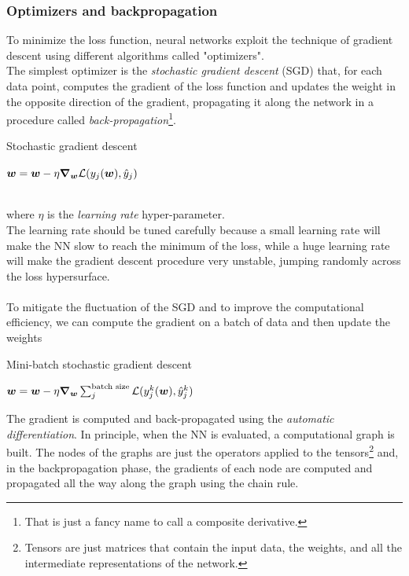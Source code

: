 \subsubsection*{Optimizers and backpropagation}
To minimize the loss function, neural networks exploit the technique of gradient descent using different algorithms called "optimizers".\\
The simplest optimizer is the \textit{stochastic gradient descent} (SGD) that, for each data point, computes the gradient of the loss function and updates the weight in the opposite direction of the gradient, propagating it along the network in a procedure called \textit{back-propagation}\footnote{That is just a fancy name to call a composite derivative.}.
\begin{algorithm}
\caption{Stochastic gradient descent}\label{algo:SGD}
\begin{algorithmic}[1]
            \State $\bm{w}=\bm{w}-\eta \grad_{\bm{w}} \mathcal{L}(y_j(\bm{w}),\hat{y}_j)$
        \EndFor
    \EndFor
\end{algorithmic}
\end{algorithm}\\
where $\eta$ is the \textit{learning rate} hyper-parameter.\\
The learning rate should be tuned carefully because a small learning rate will make the NN slow to reach the minimum of the loss, while a huge learning rate will make the gradient descent procedure very  unstable, jumping randomly across the loss hypersurface.\\
\\
To mitigate the fluctuation of the SGD and to improve the computational efficiency, we can compute the gradient on a batch of data and then update the weights
\begin{algorithm}[H]
\caption{Mini-batch stochastic gradient descent}\label{algo:miniSGD}
\begin{algorithmic}[1]
            \State $\bm{w}=\bm{w}-\eta \grad_{\bm{w}} \sum_j^{\text{batch size}} \mathcal{L}(y_j^k(\bm{w}),\hat{y}_j^k)$
        \EndFor
    \EndFor
\end{algorithmic}
\end{algorithm}
The gradient is computed and back-propagated using the \textit{automatic differentiation}.
In principle, when the NN is evaluated, a computational graph is built. The nodes of the graphs are just the operators applied to the tensors\footnote{Tensors are just matrices that contain the input data, the weights, and all the intermediate representations of the network.} and, in the backpropagation phase, the gradients of each node are computed and propagated all the way along the graph using the chain rule.\\
